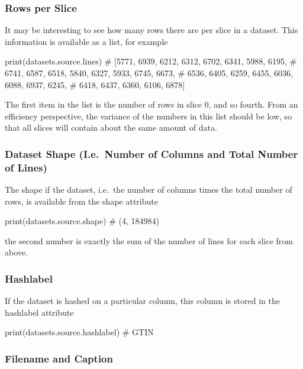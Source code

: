 \subsubsection{Rows per Slice}

It may be interesting to see how many rows there are per slice in a
dataset.  This information is available as a list, for example

\begin{python}
print(datasets.source.lines)
# [5771, 6939, 6212, 6312, 6702, 6341, 5988, 6195,
#  6741, 6587, 6518, 5840, 6327, 5933, 6745, 6673,
#  6536, 6405, 6259, 6455, 6036, 6088, 6937, 6245,
#  6418, 6437, 6360, 6106, 6878]
\end{python}
The first item in the list is the number of rows in slice 0, and so
fourth.  From an efficiency perspective, the variance of the numbers
in this list should be low, so that all slices will contain about the
same amount of data.

\subsubsection{Dataset Shape (I.e.\ Number of Columns and Total Number
  of Lines)}

The shape if the dataset, i.e.\ the number of columns times the total
number of rows, is available from the shape attribute

\begin{python}
print(datasets.source.shape)
# (4, 184984)
\end{python}
the second number is exactly the sum of the number of lines for each
slice from above.



\subsubsection{Hashlabel}

If the dataset is hashed on a particular column, this column is stored
in the hashlabel attribute

\begin{python}
print(datasets.source.hashlabel)
# GTIN
\end{python}



\subsubsection{Filename and Caption}

